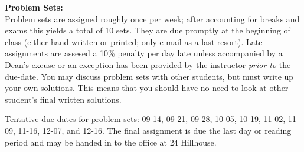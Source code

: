 \documentclass[12pt]{article}
\begin{document}
\vspace{0.5cm}

{\bf Problem Sets:} \\
Problem sets are assigned roughly once per week; after accounting for
breaks and exams this yields a total of 10 sets. They are due promptly
at the beginning of class (either hand-written or printed; only
e-mail as a last resort). Late assignments are assesed a 10\% penalty per
day late unless accompanied by a Dean's excuse or an exception has been
provided by the instructor {\it prior to} the due-date.
You may discuss problem sets with other students, but must write up your
own solutions. This means that you should have no need to look at other
student's final written solutions.

\bigskip

Tentative due dates for problem sets: 09-14, 09-21, 09-28, 10-05, 10-19, 11-02,
11-09, 11-16, 12-07, and 12-16. The final assignment is due the last day or
reading period and may be handed in to the office at 24 Hillhouse.

\newpage
\end{document}
